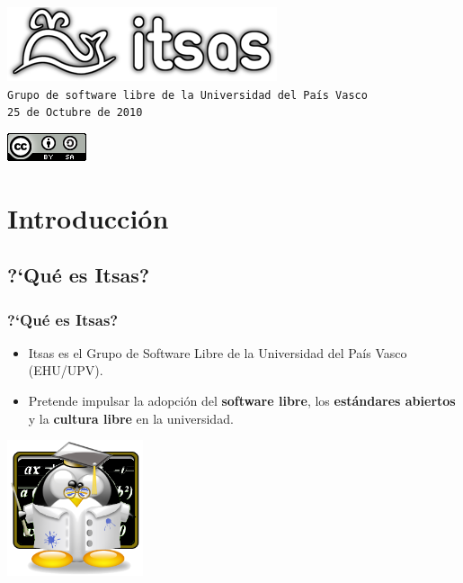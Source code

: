 \documentclass[xcolor=dvipsnames]{beamer}    %
\begin{document}
\begin{frame}
		
		
		\titlepage
		
		\vspace{-5em}
		\begin{center}
			\includegraphics{Utils/itsas.png}\\[0.7em]
			\scriptsize \tt{Grupo de software libre de la Universidad del País Vasco}\\[0.7em]
			25 de Octubre de 2010
			
			\vspace{3em}
			
			\includegraphics[scale=.4]{Utils/cc-by-sa.png}\\

		\end{center}
\end{frame}


\section{Introducci\'on}
\subsection{?`Qué es Itsas?} 

\begin{frame}\frametitle{?`Qué es Itsas?}
    \begin{itemize}
     \item Itsas es el Grupo de Software Libre de la Universidad del País Vasco (EHU/UPV).
    \item Pretende impulsar la adopci\'on del \textbf{software libre}, los
\textbf{est\'andares abiertos} y la \textbf{cultura libre} en la universidad.
    \end{itemize}
    \begin{center}
 \includegraphics[width=0.3\textwidth]{./Utils/teach_tux.png}
\end{center}

\end{frame}
\end{document}
